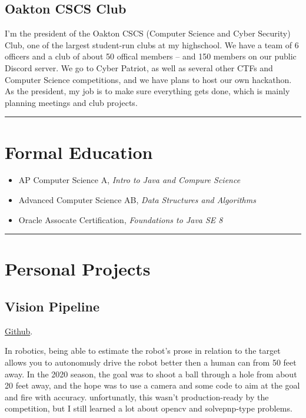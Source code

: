 \documentclass[10pt,letterpaper]{article}
\begin{document}
    \subsection*{Oakton CSCS Club}

    I'm the president of the Oakton CSCS (Computer Science and Cyber Security) Club,
    one of the largest student-run clubs at my highschool. 
    We have a team of 6 officers and a club of about 50 offical members -- and 150 members on our public Discord server.
    We go to Cyber Patriot, as well as several other CTFs and Computer Science competitions, and we have plans to host our own hackathon.
    As the president, my job is to make sure everything gets done,
    which is mainly planning meetings and club projects.

    \vspace{1em}
    \hrule

    \section*{Formal Education}
    \begin{itemize}
        \item AP Computer Science A, \textit{Intro to Java and Compure Science}
        \item Advanced Computer Science AB, \textit{Data Structures and Algorithms}
        \item Oracle Assocate Certification, \textit{Foundations to Java SE 8}
    \end{itemize}

    \vspace{0.5em}
    \hrule

    \section*{Personal Projects}

    \subsection*{Vision Pipeline}
    \href{https://github.com/CougarProgramming623/vision-pipeline}{Github}. 
    
    In robotics, being able to estimate the robot's prose in relation to the target
    allows you to autonomusly drive the robot better then a human can from 50 feet away.
    In the 2020 season, the goal was to shoot a ball through a hole from about 20 feet away,
    and the hope was to use a camera and some code to aim at the goal and fire with accuracy.
    unfortunatly, this wasn't production-ready by the competition,
    but I still learned a lot about opencv and solvepnp-type problems. 
\end{document}
